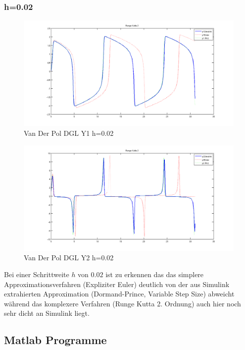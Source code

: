 \documentclass[10pt]{scrartcl}
\begin{document}
	\subsubsection{h=0.02}	
		\begin{figure}[H]
			\centering	
			\includegraphics[width=\textwidth]{vanDerPolY102.png}
            \caption{Van Der Pol DGL Y1 h=0.02}
            \label{pic:y2vdp02}
		\end{figure} 
		
		\begin{figure}[H]
			\centering	
			\includegraphics[width=\textwidth]{vanDerPolY202.png}
            \caption{Van Der Pol DGL Y2 h=0.02}
            \label{pic:y2vdp02}
		\end{figure}		
		
	Bei einer Schrittweite $h$ von $0.02$ ist zu erkennen das das simplere Approximationsverfahren (Expliziter Euler) deutlich von der aus Simulink extrahierten Approximation (Dormand-Prince, Variable Step Size) abweicht während das komplexere Verfahren (Runge Kutta 2. Ordnung) auch hier noch sehr dicht an Simulink liegt.
	
	\subsection{Matlab Programme}
	
	
		
\end{document}
